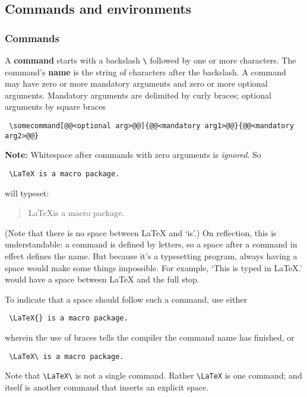 \documentclass[a4paper,11pt]{scrartcl}\usepackage[]{graphicx}\usepackage[]{color}
\newcommand{\defi}[1]{\textbf{\textsf{#1}}}
\newcommand{\Code}[1]{\Colorbox{gray!10}{\lstinline!#1!}}
\begin{document}
 
 \subsection{Commands and environments}
 \subsubsection{Commands}
 A \defi{command} starts with a backslash \verb=\= followed by one or more characters.
 The command's \defi{name} is the string of characters after the backslash. 
 A {command} may have zero or more mandatory arguments and zero or more optional arguments. 
 Mandatory arguments are delimited by curly braces; optional arguments by square braces

 \begin{lstlisting}
 \somecommand[@@<optional arg>@@]{@@<mandatory arg1>@@}{@@<mandatory arg2>@@}
 \end{lstlisting} 

 \textbf{\textsf{Note:}} Whitespace after commands with zero arguments is \emph{ignored}. So 

 \begin{lstlisting}
 \LaTeX is a macro package.
 \end{lstlisting}
 
 will typeset: 
\begin{quote}
 \LaTeX is a macro package.
 \end{quote} 
 (Note that there is no space between \LaTeX{} and `is'.)
 On reflection, this is understandable: a command is defined by letters, so a space after a command in effect defines the name.
 But because it's a typesetting program, always having a space would make some things impossible. 
 For example, `This is typed in \LaTeX.' would have a space between \LaTeX{} and the full stop.

 To indicate that a space should follow such a command, use either 

 \begin{lstlisting}
 \LaTeX{} is a macro package.
 \end{lstlisting}
 wherein the use of braces tells the compiler the command name has finished, or 

 \begin{lstlisting}
 \LaTeX\ is a macro package.
 \end{lstlisting}
 Note that \lstinline!\LaTeX\! is not a single command. 
 Rather \lstinline!\LaTeX! is one command; and \Code{\\  } itself is another command that inserts an explicit space. 
\end{document}
